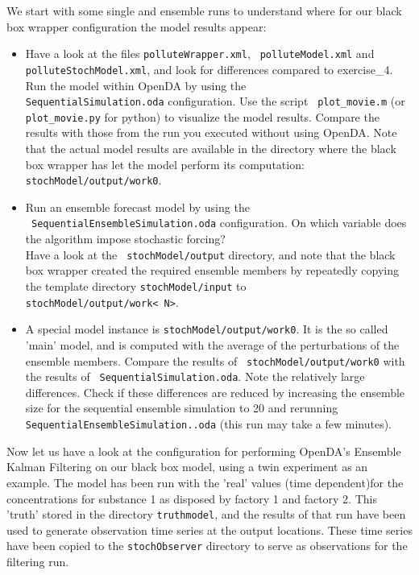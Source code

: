 We start with some single and ensemble runs to understand where for our black
box wrapper configuration the model results appear:
\begin{itemize}

 \item Have a look at the files {\tt polluteWrapper.xml}, {\tt
   polluteModel.xml} and {\tt polluteStochModel.xml}, and look for differences compared to exercise\_4.
   Run the model within OpenDA by using
   the \\{\tt SequentialSimulation.oda} configuration. Use the script {\tt
   plot\_movie.m} (or {\tt plot\_movie.py} for python) to visualize the model 
   results. Compare the results with
   those from the run you executed without using OpenDA. Note that the actual
   model results are available in the directory where the black box wrapper has
   let the model perform its computation: {\tt stochModel/output/work0}.
 \item Run an ensemble forecast model by using the \\{\tt
   SequentialEnsembleSimulation.oda} configuration. On which variable does the
   algorithm impose stochastic forcing?\\ Have a look at the {\tt
     stochModel/output} directory, and note that the black box wrapper created
   the required ensemble members by repeatedly copying the template directory
   {\tt stochModel/input} to\\ {\tt stochModel/output/work\textless
     N\textgreater}.
 \item A special model instance is {\tt stochModel/output/work0}. It is the so
   called 'main' model, and is computed with the average of the perturbations
   of the ensemble members. Compare the results of {\tt
     stochModel/output/work0} with the results of {\tt
     SequentialSimulation.oda}. Note the relatively large differences. Check if
   these differences are reduced by increasing the ensemble size for the
   sequential ensemble simulation to 20 and rerunning {\tt
     SequentialEnsembleSimulation..oda} (this run may take a few minutes).
\end{itemize}

Now let us have a look at the configuration for performing OpenDA's Ensemble
Kalman Filtering on our black box model, using a twin experiment as an example.
The model has been run with the 'real' values (time dependent)for the
concentrations for substance 1 as disposed by factory 1 and factory 2. This
'truth' stored in the directory {\tt truthmodel}, and the results of that run
have been used to generate observation time series at the output locations.
These time series have been copied to the {\tt stochObserver} directory to
serve as observations for the filtering run.

